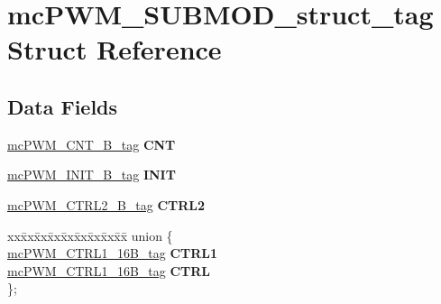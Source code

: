 \hypertarget{structmcPWM__SUBMOD__struct__tag}{}\section{mc\+P\+W\+M\+\_\+\+S\+U\+B\+M\+O\+D\+\_\+struct\+\_\+tag Struct Reference}
\label{structmcPWM__SUBMOD__struct__tag}
\subsection*{Data Fields}
\begin{DoxyCompactItemize}
\item 
\mbox{\label{structmcPWM__SUBMOD__struct__tag_a235fd753fa3fa62963f9e984dc4542db}} 
\mbox{\hyperlink{unionmcPWM__CNT__16B__tag}{mc\+P\+W\+M\+\_\+\+C\+N\+T\+\_\+B\+\_\+tag}} {\bfseries C\+NT}
\item 
\mbox{\label{structmcPWM__SUBMOD__struct__tag_a8c2f91a6a976c296d4c64c04a66f576f}} 
\mbox{\hyperlink{unionmcPWM__INIT__16B__tag}{mc\+P\+W\+M\+\_\+\+I\+N\+I\+T\+\_\+B\+\_\+tag}} {\bfseries I\+N\+IT}
\item 
\mbox{\label{structmcPWM__SUBMOD__struct__tag_a974b9804a323803cb91a6ec220413c90}} 
\mbox{\hyperlink{unionmcPWM__CTRL2__16B__tag}{mc\+P\+W\+M\+\_\+\+C\+T\+R\+L2\+\_\+B\+\_\+tag}} {\bfseries C\+T\+R\+L2}
\item 
\mbox{\label{structmcPWM__SUBMOD__struct__tag_ac4460a30df196fa96009c4e1e2fc5ec3}} 
\begin{tabbing}
xx\=xx\=xx\=xx\=xx\=xx\=xx\=xx\=xx\=\kill
union \{\\
\>\mbox{\hyperlink{unionmcPWM__CTRL1__16B__tag}{mcPWM\_CTRL1\_16B\_tag}} {\bfseries CTRL1}\\
\>\mbox{\hyperlink{unionmcPWM__CTRL1__16B__tag}{mcPWM\_CTRL1\_16B\_tag}} {\bfseries CTRL}\\
\}; \\


\end{tabbing}
\end{DoxyCompactItemize}
